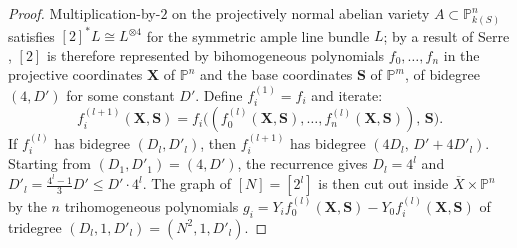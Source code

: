\begin{proof}
  Multiplication-by-\(2\) on the projectively normal abelian variety
  \(A \subset \mathbb{P}^n_{k(S)}\) satisfies \([2]^* L \cong L^{\otimes 4}\) for the
  symmetric ample line bundle \(L\); by a result of Serre
  \cite[Corollaire~2, Appendix~II]{Ast6970}, \([2]\) is therefore represented by
  bihomogeneous polynomials \(f_0, \ldots, f_n\) in the projective coordinates
  \(\mathbf{X}\) of \(\mathbb{P}^n\) and the base coordinates \(\mathbf{S}\) of
  \(\mathbb{P}^m\), of bidegree \((4, D')\) for some constant \(D'\).
  Define \(f^{(1)}_i = f_i\) and iterate:
  \[
    f^{(l+1)}_i(\mathbf{X}, \mathbf{S})
    = f_i\bigl((f^{(l)}_0(\mathbf{X}, \mathbf{S}),
               \ldots,
               f^{(l)}_n(\mathbf{X}, \mathbf{S})),\, \mathbf{S}\bigr).
  \]
  If \(f^{(l)}_i\) has bidegree \((D_l, D'_l)\), then \(f^{(l+1)}_i\) has
  bidegree \((4D_l,\, D' + 4D'_l)\). Starting from \((D_1, D'_1) = (4, D')\),
  the recurrence gives \(D_l = 4^l\) and \(D'_l = \tfrac{4^l - 1}{3}D' \le D' \cdot 4^l\).
  The graph of \([N] = [2^l]\) is then cut out inside \(\overline{X} \times \mathbb{P}^n\)
  by the \(n\) trihomogeneous polynomials
  \(g_i = Y_i f^{(l)}_0(\mathbf{X}, \mathbf{S}) - Y_0 f^{(l)}_i(\mathbf{X}, \mathbf{S})\)
  of tridegree \((D_l, 1, D'_l) = (N^2, 1, D'_l)\).
\end{proof}

